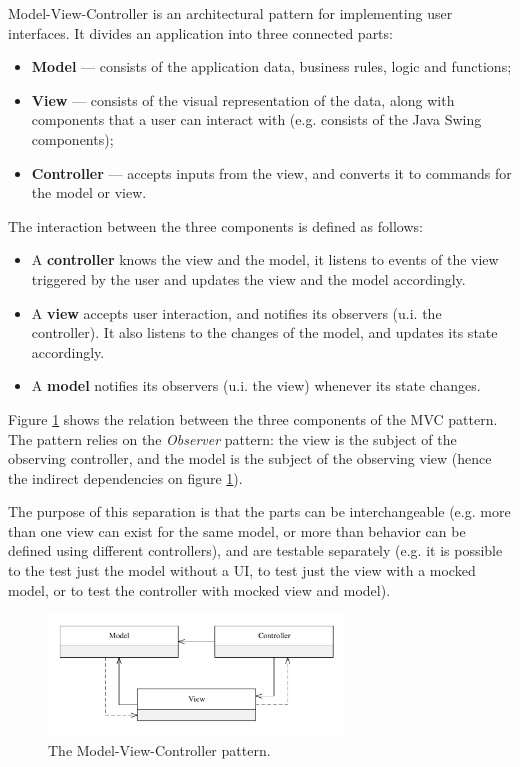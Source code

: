 Model-View-Controller is an architectural pattern for implementing user interfaces\cite{krasner_description_1988}. It divides an application into three connected parts:
\begin{itemize}
\item \textbf{Model} --- consists of the application data, business rules, logic and functions;
\item \textbf{View} --- consists of the visual representation of the data, along with components that a user can interact with (e.g. consists of the Java Swing components);
\item \textbf{Controller} --- accepts inputs from the view, and converts it to commands for the model or view.
\end{itemize}

The interaction between the three components is defined as follows:
\begin{itemize}
\item A \textbf{controller} knows the view and the model, it listens to events of the view triggered by the user and updates the view and the model accordingly.
\item A \textbf{view} accepts user interaction, and notifies its observers (u.i. the controller). It also listens to the changes of the model, and updates its state accordingly.
\item A \textbf{model} notifies its observers (u.i. the view) whenever its state changes.
\end{itemize}

Figure \ref{fig:mvc_pattern} shows the relation between the three components of the MVC pattern. The pattern relies on the \emph{Observer} pattern: the view is the subject of the observing controller, and the model is the subject of the observing view (hence the indirect dependencies on figure \ref{fig:mvc_pattern}).

The purpose of this separation is that the parts can be interchangeable (e.g. more than one view can exist for the same model, or more than behavior can be defined using different controllers), and are testable separately (e.g. it is possible to the test just the model without a UI, to test just the view with a mocked model, or to test the controller with mocked view and model).

\begin{figure}[h!]
\centering
  \includegraphics[width=0.7\textwidth]{images/mvc-design-pattern.pdf}
\caption{The Model-View-Controller pattern.}
\label{fig:mvc_pattern}
\end{figure}

